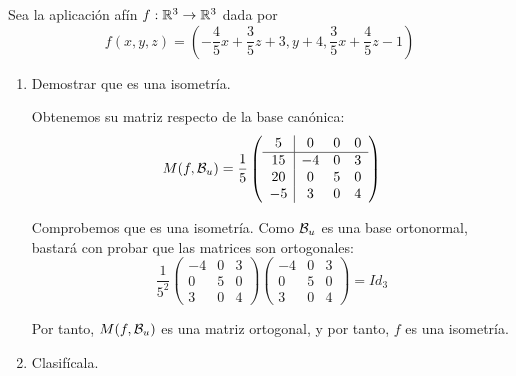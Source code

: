 \documentclass[12pt]{article}
\begin{document}
    \begin{ejercicio}[4 puntos]
        Sea la aplicación afín $f:\mathbb{R}^3\to \mathbb{R}^3$ dada por
        \begin{equation*}
            f(x,y,z)=\left(-\frac{4}{5}x + \frac{3}{5}z + 3, y+4,\frac{3}{5}x + \frac{4}{5}z-1\right)
        \end{equation*}
        \begin{enumerate}
            \item Demostrar que es una isometría.
            
            Obtenemos su matriz respecto de la base canónica:
            \begin{equation*}
                M(f,\mathcal{B}_u) = \frac{1}{5} \left(
                    \begin{array}{c|ccc}
                        5 & 0 & 0 & 0\\ \hline
                        15 & -4 & 0 & 3\\
                        20 & 0 & 5 & 0\\
                        -5 & 3 & 0 & 4
                    \end{array}
                \right)
            \end{equation*}

            Comprobemos que es una isometría. Como $\mathcal{B}_u$ es una 
            base ortonormal, bastará con probar que las matrices son ortogonales:
            \begin{equation*}
                \frac{1}{5^2}\left(
                    \begin{array}{ccc}
                        -4 & 0 & 3\\
                        0 & 5 & 0\\
                        3 & 0 & 4
                    \end{array}
                \right)\left(
                    \begin{array}{ccc}
                        -4 & 0 & 3\\
                        0 & 5 & 0\\
                        3 & 0 & 4
                    \end{array}
                \right) = Id_3
            \end{equation*}

            Por tanto, $M(f,\mathcal{B}_u)$ es una matriz ortogonal, y por tanto, $f$ es una isometría.

            \item Clasifícala.
            

\end{enumerate}
\end{ejercicio}
\end{document}
